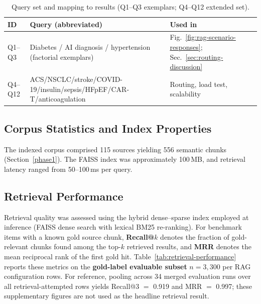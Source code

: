 \begin{table}[t]
\centering
\caption{Query set and mapping to results (Q1--Q3 exemplars; Q4--Q12 extended set).}
\label{tab:query-mapping}
\footnotesize
\setlength{\tabcolsep}{3pt}
\renewcommand{\arraystretch}{1.1}

\begin{tabular}{l|p{}|p{}}
\hline
\textbf{ID} & \textbf{Query (abbreviated)} & \textbf{Used in} \\
\hline

Q1--Q3 & Diabetes / AI diagnosis / hypertension (factorial exemplars) & Fig.~\ref{fig:rag-scenario-responses}; Sec.~\ref{sec:routing-discussion} \\

Q4--Q12 & ACS/NSCLC/stroke/COVID-19/insulin/sepsis/HFpEF/CAR-T/anticoagulation & Routing, load test, scalability \\

\hline
\end{tabular}

\end{table}

\subsection{Corpus Statistics and Index Properties}
\label{results:corpus}

The indexed corpus comprised 115 sources yielding 556 semantic chunks (Section~\ref{phase1}). The FAISS index was approximately 100\,MB, and retrieval latency ranged from 50--100\,ms per query.

\subsection{Retrieval Performance}
\label{results:retrieval}

Retrieval quality was assessed using the hybrid dense--sparse index employed at inference (FAISS dense search with lexical BM25 re-ranking). For benchmark items with a known gold source chunk, \textbf{Recall@$k$} denotes the fraction of gold-relevant chunks found among the top-$k$ retrieved results, and \textbf{MRR} denotes the mean reciprocal rank of the first gold hit. Table~\ref{tab:retrieval-performance} reports these metrics on the \textbf{gold-label evaluable subset} $n{=}3{,}300$ per RAG configuration rows. For reference, pooling across 34 merged evaluation runs over all retrieval-attempted rows yields Recall@3 $=$ 0.919 and MRR $=$ 0.997; these supplementary figures are not used as the headline retrieval result.

